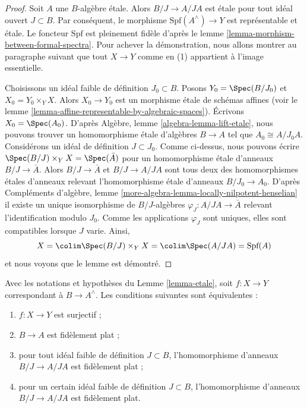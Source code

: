 \begin{proof}
Soit $A$ une $B$-algèbre étale. Alors $B/J \to A/JA$ est
étale pour tout idéal ouvert $J \subset B$. Par conséquent,
le morphisme $\text{Spf}(A^\wedge) \to Y$ est représentable et étale.
Le foncteur $\text{Spf}$ est pleinement fidèle d'après le
lemme \ref{lemma-morphism-between-formal-spectra}.
Pour achever la démonstration, nous allons montrer au paragraphe suivant
que tout $X \to Y$ comme en (1) appartient à l'image essentielle.

\medskip\noindent
Choisissons un idéal faible de définition $J_0 \subset B$. Posons
$Y_0 = \Spec(B/J_0)$ et $X_0 = Y_0 \times_Y X$. Alors $X_0 \to Y_0$
est un morphisme étale de schémas affines (voir le
lemme \ref{lemma-affine-representable-by-algebraic-spaces}).
Écrivons $X_0 = \Spec(A_0)$. D'après Algèbre, lemme \ref{algebra-lemma-lift-etale},
nous pouvons trouver un homomorphisme étale d'algèbres $B \to A$ tel que
$A_0 \cong A/J_0A$. Considérons un idéal de définition $J \subset J_0$.
Comme ci-dessus, nous pouvons écrire $\Spec(B/J) \times_Y X = \Spec(\bar A)$
pour un homomorphisme étale d'anneaux $B/J \to \bar A$. Alors
$B/J \to \bar A$ et $B/J \to A/JA$ sont tous deux des homomorphismes étales d'anneaux
relevant l'homomorphisme étale d'anneaux $B/J_0 \to A_0$. D'après
Compléments d'algèbre, lemme \ref{more-algebra-lemma-locally-nilpotent-henselian}
il existe un unique isomorphisme de $B/J$-algèbres
$\varphi_J : A/JA \to \bar A$ relevant l'identification modulo $J_0$.
Comme les applications $\varphi_J$ sont uniques, elles sont compatibles lorsque $J$ varie.
Ainsi,
$$
X = \colim \Spec(B/J) \times_Y X = \colim \Spec(A/JA) = \text{Spf}(A)
$$
et nous voyons que le lemme est démontré.
\end{proof}

\begin{lemma}
\label{lemma-etale-surjective}
Avec les notations et hypothèses du Lemme \ref{lemma-etale}, soit
$f : X \to Y$ correspondant à $B \to A^\wedge$. Les conditions suivantes sont équivalentes :
\begin{enumerate}
\item $f : X \to Y$ est surjectif ;
\item $B \to A$ est fidèlement plat ;
\item pour tout idéal faible de définition $J \subset B$,
l'homomorphisme d'anneaux $B/J \to A/JA$ est fidèlement plat ;
\item pour un certain idéal faible de définition $J \subset B$,
l'homomorphisme d'anneaux $B/J \to A/JA$ est fidèlement plat.
\end{enumerate}
\end{lemma}

